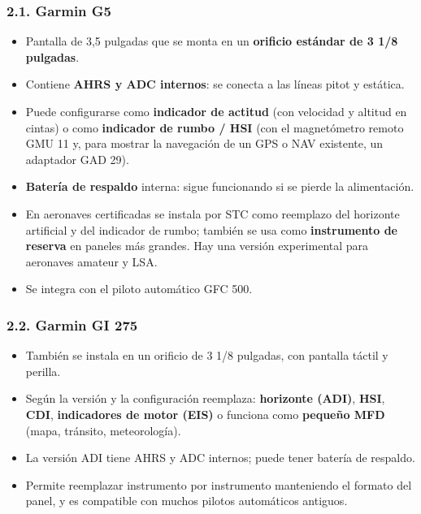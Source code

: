 \subsubsection*{2.1. Garmin G5}
\begin{itemize}
  \item Pantalla de 3,5 pulgadas que se monta en un \textbf{orificio estándar de 3 1/8 pulgadas}.
  \item Contiene \textbf{AHRS y ADC internos}: se conecta a las líneas pitot y estática.
  \item Puede configurarse como \textbf{indicador de actitud} (con velocidad y altitud en cintas) o
        como \textbf{indicador de rumbo / HSI} (con el magnetómetro remoto GMU 11 y, para mostrar
        la navegación de un GPS o NAV existente, un adaptador GAD 29).
  \item \textbf{Batería de respaldo} interna: sigue funcionando si se pierde la alimentación.
  \item En aeronaves certificadas se instala por STC como reemplazo del horizonte artificial y del
        indicador de rumbo; también se usa como \textbf{instrumento de reserva} en paneles más
        grandes. Hay una versión experimental para aeronaves amateur y LSA.
  \item Se integra con el piloto automático GFC 500.
\end{itemize}

\subsubsection*{2.2. Garmin GI 275}
\begin{itemize}
  \item También se instala en un orificio de 3 1/8 pulgadas, con pantalla táctil y perilla.
  \item Según la versión y la configuración reemplaza: \textbf{horizonte (ADI)}, \textbf{HSI},
        \textbf{CDI}, \textbf{indicadores de motor (EIS)} o funciona como \textbf{pequeño MFD}
        (mapa, tránsito, meteorología).
  \item La versión ADI tiene AHRS y ADC internos; puede tener batería de respaldo.
  \item Permite reemplazar instrumento por instrumento manteniendo el formato del panel, y es
        compatible con muchos pilotos automáticos antiguos.
\end{itemize}

